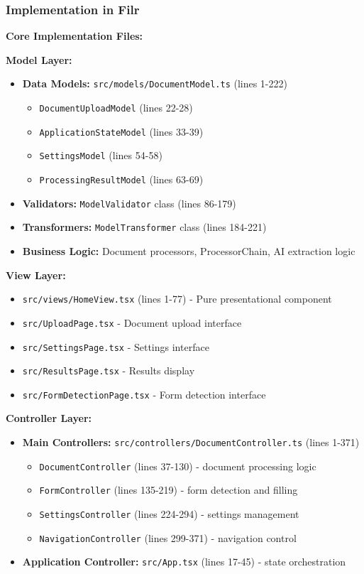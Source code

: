 \documentclass[11pt]{article}
\begin{document}
\subsubsection{Implementation in Filr}

\textbf{Core Implementation Files:}

\textbf{Model Layer:}
\begin{itemize}[noitemsep]
    \item \textbf{Data Models:} \texttt{src/models/DocumentModel.ts} (lines 1-222)
    \begin{itemize}[noitemsep]
        \item \texttt{DocumentUploadModel} (lines 22-28)
        \item \texttt{ApplicationStateModel} (lines 33-39)
        \item \texttt{SettingsModel} (lines 54-58)
        \item \texttt{ProcessingResultModel} (lines 63-69)
    \end{itemize}
    \item \textbf{Validators:} \texttt{ModelValidator} class (lines 86-179)
    \item \textbf{Transformers:} \texttt{ModelTransformer} class (lines 184-221)
    \item \textbf{Business Logic:} Document processors, ProcessorChain, AI extraction logic
\end{itemize}

\textbf{View Layer:}
\begin{itemize}[noitemsep]
    \item \texttt{src/views/HomeView.tsx} (lines 1-77) - Pure presentational component
    \item \texttt{src/UploadPage.tsx} - Document upload interface
    \item \texttt{src/SettingsPage.tsx} - Settings interface
    \item \texttt{src/ResultsPage.tsx} - Results display
    \item \texttt{src/FormDetectionPage.tsx} - Form detection interface
\end{itemize}

\textbf{Controller Layer:}
\begin{itemize}[noitemsep]
    \item \textbf{Main Controllers:} \texttt{src/controllers/DocumentController.ts} (lines 1-371)
    \begin{itemize}[noitemsep]
        \item \texttt{DocumentController} (lines 37-130) - document processing logic
        \item \texttt{FormController} (lines 135-219) - form detection and filling
        \item \texttt{SettingsController} (lines 224-294) - settings management
        \item \texttt{NavigationController} (lines 299-371) - navigation control
    \end{itemize}
    \item \textbf{Application Controller:} \texttt{src/App.tsx} (lines 17-45) - state orchestration
\end{itemize}
\end{document}
